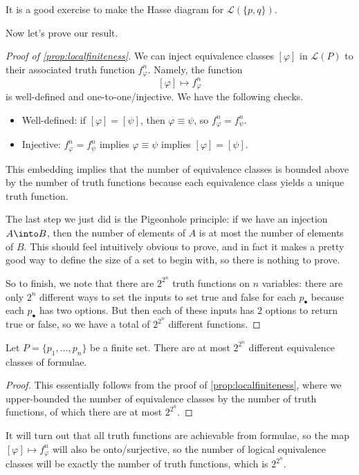 It is a good exercise to make the Hasse diagram for $\mathcal L(\{p,q\})$.

Now let's prove our result.
\begin{proof}[Proof of \autoref{prop:localfiniteness}]
	We can inject equivalence classes $[\varphi]$ in $\mathcal L(P)$ to their associated truth function $f_\varphi^n$. Namely, the function
	\[[\varphi]\mapsto f_\varphi^n\]
	is well-defined and one-to-one/injective. We have the following checks.
	\begin{itemize}
		\item Well-defined: if $[\varphi]=[\psi]$, then $\varphi\equiv\psi$, so $f_\varphi^n=f_\psi^n$.
		\item Injective: $f_\varphi^n=f_\psi^n$ implies $\varphi\equiv\psi$ implies $[\varphi]=[\psi]$.
	\end{itemize}
	This embedding implies that the number of equivalence classes is bounded above by the number of truth functions because each equivalence class yields a unique truth function.
	\begin{remark}
		The last step we just did is the Pigeonhole principle: if we have an injection $A\into B$, then the number of elements of $A$ is at most the number of elements of $B$. This should feel intuitively obvious to prove, and in fact it makes a pretty good way to define the size of a set to begin with, so there is nothing to prove.
	\end{remark}
	So to finish, we note that there are $2^{2^n}$ truth functions on $n$ variables: there are only $2^n$ different ways to set the inputs to set true and false for each $p_\bullet$ because each $p_\bullet$ has two options. But then each of these inputs has $2$ options to return true or false, so we have a total of $2^{2^n}$ different functions.
\end{proof}
\begin{corollary} \label{cor:countequivclasses}
	Let $P=\{p_1,\ldots,p_n\}$ be a finite set. There are at most $2^{2^n}$ different equivalence classes of formulae.
\end{corollary}
\begin{proof}
	This essentially follows from the proof of \autoref{prop:localfiniteness}, where we upper-bounded the number of equivalence classes by the number of truth functions, of which there are at most $2^{2^n}$.
\end{proof}
\begin{remark} \label{rem:completeness}
	It will turn out that all truth functions are achievable from formulae, so the map $[\varphi]\mapsto f_\varphi^n$ will also be onto/surjective, so the number of logical equivalence classes will be exactly the number of truth functions, which is $2^{2^n}$.
\end{remark}

